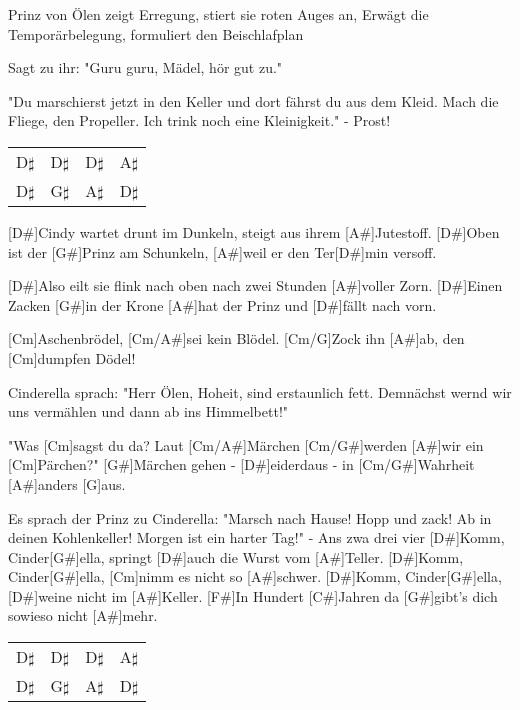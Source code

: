 \begin{guitar}
	Prinz von Ölen zeigt Erregung, stiert sie roten Auges an,
	Erwägt die Temporärbelegung, formuliert den Beischlafplan
	
	Sagt zu ihr: "Guru guru, Mädel, hör gut zu."
	
	"Du marschierst jetzt in den Keller und dort fährst du aus dem Kleid.
	Mach die Fliege, den Propeller. Ich trink noch eine Kleinigkeit."
	\hfill- Prost!\vspace{-0.3em}
	 
	
	 {\footnotesize\begin{tabular}{l|l|l|l}
			D$\sharp$ & D$\sharp$ & D$\sharp$ & A$\sharp$ \\
			D$\sharp$ & G$\sharp$ & A$\sharp$ & D$\sharp$ 
	\end{tabular}}
	
	[D#]Cindy wartet drunt im Dunkeln, steigt aus ihrem [A#]Jutestoff.
	[D#]Oben ist der [G#]Prinz am Schunkeln, [A#]weil er den Ter[D#]min versoff.
	
	[D#]Also eilt sie flink nach oben nach zwei Stunden [A#]voller Zorn.
	[D#]Einen Zacken [G#]in der Krone [A#]hat der Prinz und [D#]fällt nach vorn.
	
	[Cm]Aschenbrödel, [Cm/A#]sei kein Blödel. [Cm/G]Zock ihn [A#]ab, den [Cm]dumpfen Dödel!
	
	Cinderella sprach: "Herr Ölen, Hoheit, sind erstaunlich fett.
	Demnächst wernd wir uns vermählen und dann ab ins Himmelbett!"
	
	"Was [Cm]sagst du da? Laut [Cm/A#]Märchen [Cm/G#]werden [A#]wir ein [Cm]Pärchen?"
	[G#]Märchen gehen - [D#]eiderdaus - in [Cm/G#]Wahrheit [A#]anders [G]aus.
	
	Es sprach der Prinz zu Cinderella: "Marsch nach Hause! Hopp und zack!
	Ab in deinen Kohlenkeller! Morgen ist ein harter Tag!"
	\hfill- Ans zwa drei vier\vspace{-0.3em}
	[D#]Komm, Cinder[G#]ella, springt [D#]auch die Wurst vom [A#]Teller.
	[D#]Komm, Cinder[G#]ella, [Cm]nimm es nicht so [A#]schwer.
	[D#]Komm, Cinder[G#]ella, [D#]weine nicht im [A#]Keller.
	[F#]In Hundert [C#]Jahren da [G#]gibt's dich sowieso nicht [A#]mehr.
	
	 {\footnotesize\begin{tabular}{l|l|l|l}
			D$\sharp$ & D$\sharp$ & D$\sharp$ & A$\sharp$ \\
			D$\sharp$ & G$\sharp$ & A$\sharp$ & D$\sharp$ 
	\end{tabular}}
\end{guitar}